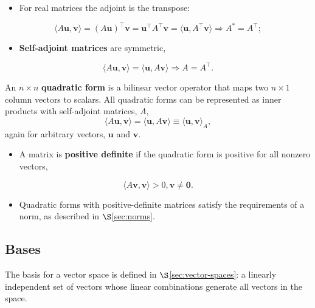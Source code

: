 \documentclass[12pt, twoside, draft]{article}
\begin{document}
\begin{itemize}
\item For real matrices the adjoint is the transpose:
\end{itemize}
\begin{equation}\label{eq:adjoint_matrix_real}
\langle A \mathbf{u}, \mathbf{v} \rangle = (A \mathbf{u})^\top \mathbf{v} = \mathbf{u}^\top A^\top \mathbf{v} = \langle \mathbf{u}, A^\top \mathbf{v} \rangle \Rightarrow A^* = A^\top;
\end{equation}
\begin{itemize}
\item \textbf{Self-adjoint matrices} are symmetric, 
\end{itemize}
\begin{equation}\label{eq:self-adjoint_matrix_symmetric}
\langle A \mathbf{u}, \mathbf{v} \rangle = \langle \mathbf{u}, A \mathbf{v} \rangle \Rightarrow A = A^\top.
\end{equation}

An $n \times n$ \textbf{quadratic form}  is a bilinear vector operator that maps two $n \times 1$ column vectors to scalars.  All quadratic forms can be represented as inner products with self-adjoint matrices, $A$,
\begin{equation}\label{eq:quadratic_form}
\langle A \mathbf{u}, \mathbf{v} \rangle = \langle \mathbf{u}, A \mathbf{v} \rangle \equiv \langle \mathbf{u}, \mathbf{v} \rangle_A,
\end{equation}
again for arbitrary vectors, $\mathbf{u}$ and $\mathbf{v}$.
\begin{itemize}
\item A matrix is \textbf{positive definite} if the quadratic form is positive for all nonzero vectors,
\end{itemize}
\begin{equation}\label{eq:positive_definite}
\langle A \mathbf{v}, \mathbf{v} \rangle > 0, \mathbf{v} \neq \mathbf{0}.
\end{equation}
\begin{itemize}
\item Quadratic forms with positive-definite matrices satisfy the requirements of a norm, as described in $\S$\ref{sec:norms}.
\end{itemize}

\subsection{Bases}\label{sec:bases}
The basis for a vector space is defined in $\S$\ref{sec:vector-spaces}: a linearly independent set of vectors whose linear combinations generate all vectors in the space.  
\end{document}
